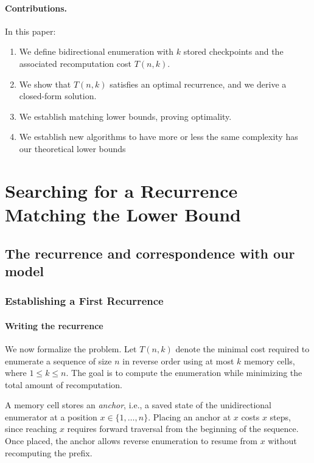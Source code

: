 \documentclass[a4paper,10pt]{article}
\begin{document}
\paragraph{Contributions.} In this paper:
\begin{enumerate}
    \item We define bidirectional enumeration with $k$ stored checkpoints and the associated recomputation cost $T(n,k)$.
    \item We show that $T(n,k)$ satisfies an optimal recurrence, and we derive a closed-form solution.
    \item We establish matching lower bounds, proving optimality.
    \item We establish new algorithms to have more or less the same complexity has our theoretical lower bounds
\end{enumerate}

\section{Searching for a Recurrence Matching the Lower Bound}

        \subsection{The recurrence and correspondence with our model}

            \subsubsection*{Establishing a First Recurrence}

                \paragraph{Writing the recurrence}

                We now formalize the problem. Let $T(n,k)$ denote the minimal cost required to enumerate a sequence of size $n$ in reverse order using at most $k$ memory cells, where $1 \le k \le n$. The goal is to compute the enumeration while minimizing the total amount of recomputation.

A memory cell stores an \emph{anchor}, i.e., a saved state of the unidirectional enumerator at a position $x \in \{1,\dots,n\}$. Placing an anchor at $x$ costs $x$ steps, since reaching $x$ requires forward traversal from the beginning of the sequence. Once placed, the anchor allows reverse enumeration to resume from $x$ without recomputing the prefix.
\end{document}
